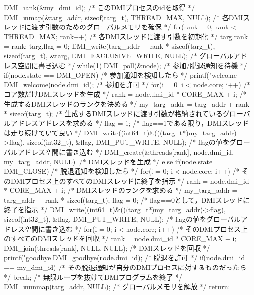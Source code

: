 \documentclass[report,12pt]{jsbook}
\begin{document}
\begin{code}
{  DMI_rank(&my_dmi_id);  /* このDMIプロセスのidを取得 */
  DMI_mmap(&targ_addr, sizeof(targ_t), THREAD_MAX, NULL);  /* 各DMIスレッドに渡す引数のためのグローバルメモリを確保 */
  for(rank = 0; rank < THREAD_MAX; rank++)  /* 各DMIスレッドに渡す引数を初期化 */
    {
      targ.rank = rank;
      targ.flag = 0;
      DMI_write(targ_addr + rank * sizeof(targ_t), sizeof(targ_t), &targ, DMI_EXCLUSIVE_WRITE, NULL);  /* グローバルアドレス空間に書き込む */
    }
  while(1)
    {
      DMI_poll(&node);  /* 参加/脱退通知を待機 */
      if(node.state == DMI_OPEN)  /* 参加通知を検知したら */
        {
          printf("welcome %
          DMI_welcome(node.dmi_id);  /* 参加を許可 */
          for(i = 0; i < node.core; i++)  /* コア数だけDMIスレッドを生成 */
            {
              rank = node.dmi_id * CORE_MAX + i;  /* 生成するDMIスレッドのランクを決める */
              my_targ_addr = targ_addr + rank * sizeof(targ_t);  /* 生成するDMIスレッドに渡す引数が格納されているグローバルアドレスアドレスを求める */
              flag = 1;  /* flag==1である限り，DMIスレッドは走り続けていて良い */
              DMI_write((int64_t)&(((targ_t*)my_targ_addr)->flag), sizeof(int32_t), &flag, DMI_PUT_WRITE, NULL);  /* flagの値をグローバルアドレス空間に書き込む */
              DMI_create(&threads[rank], node.dmi_id, my_targ_addr, NULL);  /* DMIスレッドを生成 */
            }
        }
      else if(node.state == DMI_CLOSE)  /* 脱退通知を検知したら */
        {
          for(i = 0; i < node.core; i++)  /* そのDMIプロセス上のすべてのDMIスレッドに終了を指示 */
            {
              rank = node.dmi_id * CORE_MAX + i;  /* DMIスレッドのランクを求める */
              my_targ_addr = targ_addr + rank * sizeof(targ_t);
              flag = 0;  /* flag==0として，DMIスレッドに終了を指示 */
              DMI_write((int64_t)&(((targ_t*)my_targ_addr)->flag), sizeof(int32_t), &flag, DMI_PUT_WRITE, NULL);  /* flagの値をグローバルアドレス空間に書き込む */
            }
          for(i = 0; i < node.core; i++)  /* そのDMIプロセス上のすべてのDMIスレッドを回収 */
            {
              rank = node.dmi_id * CORE_MAX + i;
              DMI_join(threads[rank], NULL, NULL);  /* DMIスレッドを回収 */
            }
          printf("goodbye %
          DMI_goodbye(node.dmi_id);  /* 脱退を許可 */
          if(node.dmi_id == my_dmi_id)  /* その脱退通知が自分のDMIプロセスに対するものだったら */
            {
              break;  /* 無限ループを抜けてDMIプログラムを終了 */
            }
        }
    }
  DMI_munmap(targ_addr, NULL);  /* グローバルメモリを解放 */
  return;
}


\end{code}
\end{document}
